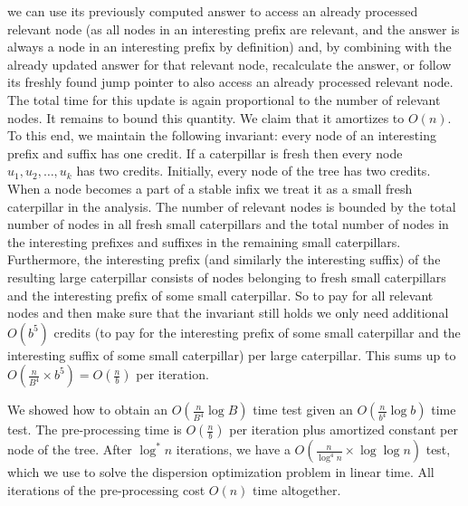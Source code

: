\documentclass[11pt,a4paper]{article}
\theoremstyle{definition}
\theoremstyle{remark}
\begin{document}
we can use its previously computed answer to access an already processed relevant node
(as all nodes in an interesting prefix are relevant, and the answer is always a node in an
interesting prefix by definition) and, by combining with the already updated answer for that
relevant node, recalculate the answer, or follow its freshly found jump pointer to also access
an already processed relevant node. The total time for this update is again proportional to the
number of relevant nodes. It remains to bound this quantity. We claim that it
amortizes to $O(n)$. To this end, we maintain the following invariant: every node
of an interesting prefix and suffix has one credit. If a caterpillar is fresh
then every node $u_{1},u_{2},\ldots,u_{k}$ has two credits. Initially, every node of the tree
has two credits. When a node becomes a part of a stable infix we treat it as a small fresh
caterpillar in the analysis. The number of relevant nodes is bounded by the total number
of nodes in all fresh small caterpillars and the total number of nodes in the interesting
prefixes and suffixes in the remaining small caterpillars. Furthermore,
the interesting prefix (and similarly the interesting suffix) of the resulting large caterpillar
consists of nodes belonging to fresh small caterpillars and the interesting prefix of
some small caterpillar. So to pay for all relevant nodes and then make sure that the invariant
still holds we only need additional $O(b^{5})$ credits (to pay for the interesting prefix
of some small caterpillar and the interesting suffix of some small caterpillar) per large
caterpillar. This sums up to $O(\frac{n}{B^{4}}\times b^{5}) = O(\frac{n}{b})$ per iteration.

We showed how to obtain an $O(\frac{n}{B^{4}}\log B)$ time test given an $O(\frac{n}{b^{4}}\log b)$
time test. The pre-processing time is $O(\frac{n}{b})$ per iteration plus amortized constant per
node of the tree. After $\log ^*n$ iterations, we have a $O(\frac{n}{\log ^4n} \times \log \log n)$ test,
which we use to solve the dispersion optimization problem in linear time. All iterations of the pre-processing
cost $O(n)$ time altogether.



\end{document}
